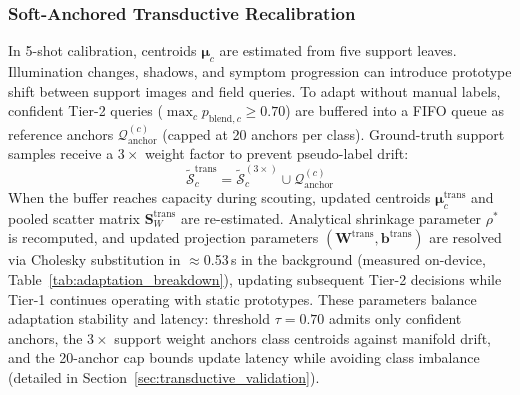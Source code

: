 \documentclass[preprint,12pt]{elsarticle}
\begin{document}
\subsubsection{Soft-Anchored Transductive Recalibration}
\label{sec:transductive}
In 5-shot calibration, centroids $\boldsymbol{\mu}_c$ are estimated from five support leaves. Illumination changes, shadows, and symptom progression can introduce prototype shift between support images and field queries. To adapt without manual labels, confident Tier-2 queries ($\max_c p_{\text{blend}, c} \ge 0.70$) are buffered into a FIFO queue as reference anchors $\mathcal{Q}_{\text{anchor}}^{(c)}$ (capped at 20 anchors per class). Ground-truth support samples receive a $3\times$ weight factor to prevent pseudo-label drift:
\begin{equation}
    \tilde{\mathcal{S}}_c^{\text{trans}} = \tilde{\mathcal{S}}_c^{(3\times)} \cup \mathcal{Q}_{\text{anchor}}^{(c)}
\end{equation}
When the buffer reaches capacity during scouting, updated centroids $\boldsymbol{\mu}_c^{\text{trans}}$ and pooled scatter matrix $\mathbf{S}_W^{\text{trans}}$ are re-estimated. Analytical shrinkage parameter $\rho^*$ is recomputed, and updated projection parameters $(\mathbf{W}^{\text{trans}}, \mathbf{b}^{\text{trans}})$ are resolved via Cholesky substitution in $\approx$0.53\,s in the background (measured on-device, Table~\ref{tab:adaptation_breakdown}), updating subsequent Tier-2 decisions while Tier-1 continues operating with static prototypes. These parameters balance adaptation stability and latency: threshold $\tau = 0.70$ admits only confident anchors, the $3\times$ support weight anchors class centroids against manifold drift, and the 20-anchor cap bounds update latency while avoiding class imbalance (detailed in Section~\ref{sec:transductive_validation}).
\end{document}
